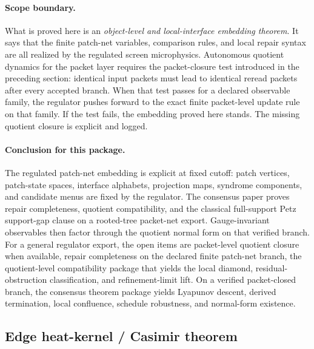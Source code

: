 \documentclass[11pt]{article}
\begin{document}
\paragraph{Scope boundary.}
What is proved here is an \emph{object-level and local-interface embedding theorem}. It says
that the finite patch-net variables, comparison rules, and local repair syntax are all realized
by the regulated screen microphysics. Autonomous quotient dynamics for the packet layer requires the
packet-closure test introduced in the preceding section: identical input packets must lead to
identical reread packets after every accepted branch. When that test passes for a declared
observable family, the regulator pushes forward to the exact finite packet-level update rule on
that family. If the test fails, the embedding proved here stands. The missing quotient closure is
explicit and logged.

\paragraph{Conclusion for this package.}
The regulated patch-net embedding is explicit at fixed cutoff: patch vertices, patch-state spaces,
interface alphabets, projection maps, syndrome components, and candidate menus are fixed by the
regulator. The consensus paper proves repair completeness, quotient compatibility, and the
classical full-support Petz support-gap clause on a rooted-tree packet-net export. Gauge-invariant
observables then factor through the quotient normal form on that verified branch. For a general
regulator export, the open items are packet-level quotient closure when available, repair
completeness on the declared finite patch-net branch, the quotient-level compatibility package
that yields the local diamond, residual-obstruction classification, and refinement-limit lift. On
a verified packet-closed branch, the consensus theorem package yields Lyapunov descent, derived
termination, local confluence, schedule robustness, and normal-form existence.

\subsection{Edge heat-kernel / Casimir theorem}\label{sec:microphysics-feeds-e24}
\end{document}
